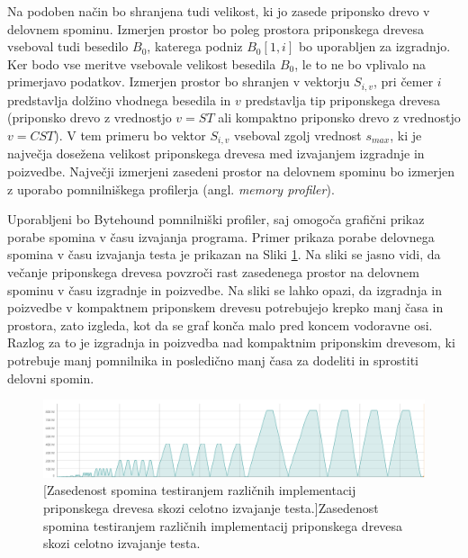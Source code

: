Na podoben način bo shranjena tudi velikost, ki jo zasede priponsko drevo v delovnem spominu. Izmerjen prostor bo poleg prostora priponskega drevesa vseboval tudi besedilo $B_{0}$, katerega podniz $B_0[1,i]$ bo uporabljen za izgradnjo. Ker bodo vse meritve vsebovale velikost besedila $B_0$, le to ne bo vplivalo na primerjavo podatkov. Izmerjen prostor bo shranjen v vektorju $S_{i,v}$, pri čemer $i$ predstavlja dolžino vhodnega besedila in $v$ predstavlja tip priponskega drevesa (priponsko drevo z vrednostjo $v=ST$ ali kompaktno priponsko drevo z vrednostjo $v=CST$). V tem primeru bo vektor $S_{i,v}$ vseboval zgolj vrednost $s_{max}$, ki je največja dosežena velikost priponskega drevesa med izvajanjem izgradnje in poizvedbe. Največji izmerjeni zasedeni prostor na delovnem spominu bo izmerjen z uporabo pomnilniškega profilerja (angl. \textit{memory profiler}).

Uporabljeni bo Bytehound \cite{Bytehound2024} pomnilniški profiler, saj omogoča grafični prikaz porabe spomina v času izvajanja programa. Primer prikaza porabe delovnega spomina v času izvajanja testa je prikazan na Sliki \ref{fig:ZasedonestRAM}. Na sliki se jasno vidi, da večanje priponskega drevesa povzroči rast zasedenega prostor na delovnem spominu v času izgradnje in poizvedbe. Na sliki se lahko opazi, da izgradnja in poizvedbe v kompaktnem priponskem drevesu potrebujejo krepko manj časa in prostora, zato izgleda, kot da se graf konča malo pred koncem vodoravne osi. Razlog za to je izgradnja in poizvedba nad kompaktnim priponskim drevesom, ki potrebuje manj pomnilnika in posledično manj časa za dodeliti in sprostiti delovni spomin.

\begin{figure}[tb]
    \begin{center}
        \includegraphics[width=\textwidth]{Slike/bytehoundGraf.png}    
        [Zasedenost spomina testiranjem različnih implementacij priponskega drevesa skozi celotno izvajanje testa.]{Zasedenost spomina testiranjem različnih implementacij priponskega drevesa skozi celotno izvajanje testa.} 
        \label{fig:ZasedonestRAM}    
    \end{center}
\end{figure}


